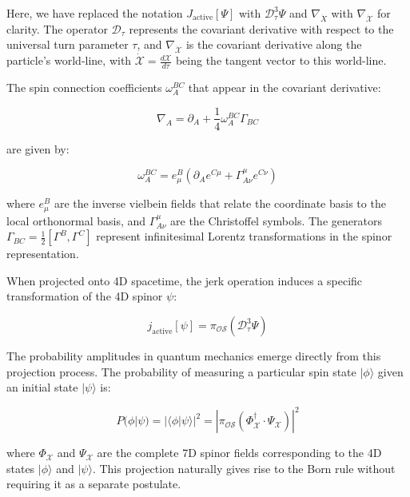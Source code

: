 \documentclass{article}
\begin{document}
Here, we have replaced the notation $J_{\text{active}}[\Psi]$ with $\mathcal{D}_\tau^3 \Psi$ and $\nabla_{\dot{X}}$ with $\nabla_{\dot{\mathcal{X}}}$ for clarity. The operator $\mathcal{D}_\tau$ represents the covariant derivative with respect to the universal turn parameter $\tau$, and $\nabla_{\dot{\mathcal{X}}}$ is the covariant derivative along the particle's world-line, with $\dot{\mathcal{X}} = \frac{d\mathcal{X}}{d\tau}$ being the tangent vector to this world-line.

The spin connection coefficients $\omega_A^{BC}$ that appear in the covariant derivative:

\begin{equation}
\nabla_A = \partial_A + \frac{1}{4}\omega_A^{BC}\Gamma_{BC}
\end{equation}

are given by:

\begin{equation}
\omega_A^{BC} = e^B_\mu (\partial_A e^{C\mu} + \Gamma^\mu_{A\nu}e^{C\nu})
\end{equation}

where $e^B_\mu$ are the inverse vielbein fields that relate the coordinate basis to the local orthonormal basis, and $\Gamma^\mu_{A\nu}$ are the Christoffel symbols. The generators $\Gamma_{BC} = \frac{1}{2}[\Gamma^B, \Gamma^C]$ represent infinitesimal Lorentz transformations in the spinor representation.

When projected onto 4D spacetime, the jerk operation induces a specific transformation of the 4D spinor $\psi$:

\begin{equation}
j_{\text{active}}[\psi] = \pi_{\mathcal{OS}}(\mathcal{D}_\tau^3 \Psi)
\end{equation}

The probability amplitudes in quantum mechanics emerge directly from this projection process. The probability of measuring a particular spin state $|\phi\rangle$ given an initial state $|\psi\rangle$ is:

\begin{equation}
P(\phi|\psi) = |\langle\phi|\psi \rangle|^2 = |\pi_{\mathcal{OS}}(\Phi^\dagger_{\mathcal{X}} \cdot \Psi_{\mathcal{X}})|^2
\end{equation}

where $\Phi_{\mathcal{X}}$ and $\Psi_{\mathcal{X}}$ are the complete 7D spinor fields corresponding to the 4D states $|\phi\rangle$ and $|\psi\rangle$. This projection naturally gives rise to the Born rule without requiring it as a separate postulate.
\end{document}
